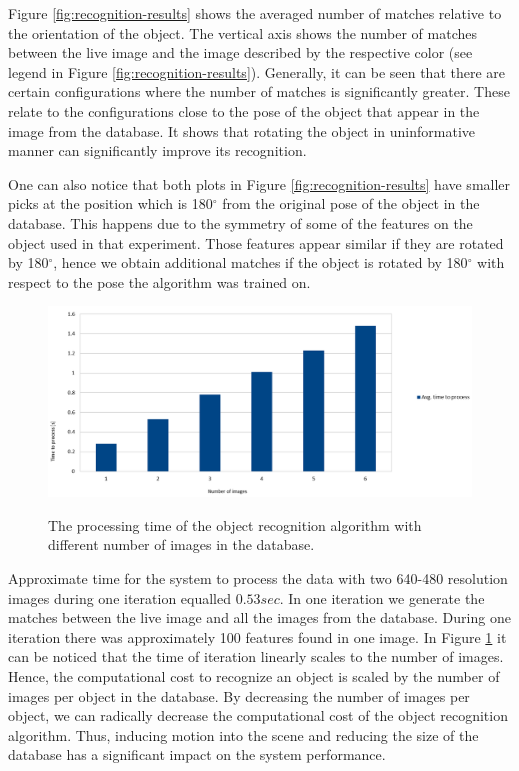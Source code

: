 Figure \ref{fig:recognition-results} shows the averaged number of matches relative to the orientation of the object. The vertical axis shows the number of matches between the live image and the image described by the respective color (see legend in Figure \ref{fig:recognition-results}). Generally, it can be seen that there are certain configurations where the number of matches is significantly greater. These relate to the configurations close to the pose of the object that appear in the image from the database. It shows that rotating the object in uninformative manner can significantly improve its recognition. 

One can also notice that both plots in Figure \ref{fig:recognition-results} have smaller picks at the position which is 180$^\circ$ from the original pose of the object in the database. This happens due to the symmetry of some of the features on the object used in that experiment. Those features appear similar if they are rotated by 180$^\circ$, hence we obtain additional matches if the object is rotated by 180$^\circ$ with respect to the pose the algorithm was trained on.

\begin{figure}
\centering 

\includegraphics[width=1.2\columnwidth]{figures/thesis-time.png}\\


\caption{The processing time of the object recognition algorithm with different number of images in the database.}
\label{fig:recognition-time}
\end{figure}

Approximate time for the system to process the data with two 640-480 resolution images during one iteration equalled $0.53 sec$. In one iteration we generate the matches between the live image and all the images from the database. During one iteration there was approximately 100 features found in one image. In Figure \ref{fig:recognition-time} it can be noticed that the time of iteration linearly scales to the number of images. Hence, the computational cost to recognize an object is scaled by the number of images per object in the database. By decreasing the number of images per object, we can radically decrease the computational cost of the object recognition algorithm. Thus, inducing motion into the scene and reducing the size of the database has a significant impact on the system performance.





